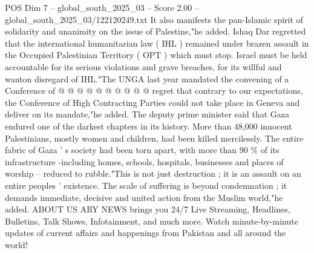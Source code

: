 \begin{textsample}{POS Dim 7 – global\_south\_2025\_03 – Score 2.00 – global\_south\_2025\_03/122120249.txt}
It also manifests the pan-Islamic spirit of solidarity and unanimity on the issue of Palestine,"he added.
Ishaq Dar regretted that the international humanitarian law ( IHL ) remained under brazen assault in the Occupied Palestinian Territory ( OPT ) which must stop.
Israel must be held accountable for its serious violations and grave breaches, for its willful and wanton disregard of IHL."The UNGA last year mandated the convening of a Conference of @ @ @ @ @ @ @ @ @ @ regret that contrary to our expectations, the Conference of High Contracting Parties could not take place in Geneva and deliver on its mandate,"he added.
The deputy prime minister said that Gaza endured one of the darkest chapters in its history.
More than 48,000 innocent Palestinians, mostly women and children, had been killed mercilessly.
The entire fabric of Gaza ' s society had been torn apart, with more than 90 \% of its infrastructure -including homes, schools, hospitals, businesses and places of worship -- reduced to rubble."This is not just destruction ; it is an assault on an entire peoples ' existence.
The scale of suffering is beyond condemnation ; it demands immediate, decisive and united action from the Muslim world,"he added.
ABOUT US ARY NEWS brings you 24/7 Live Streaming, Headlines, Bulletins, Talk Shows, Infotainment, and much more.
Watch minute-by-minute updates of current affairs and happenings from Pakistan and all around the world!

\end{textsample}
